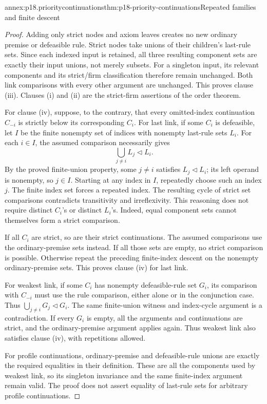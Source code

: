 \begin{annexitem}{annex:p18.prioritycontinuations}{thm:p18-priority-continuations}{Repeated families and finite descent}
\begin{proof}
Adding only strict nodes and axiom leaves creates no new ordinary premise
or defeasible rule. Strict nodes take unions of their children's last-rule
sets. Since each indexed input is retained, all three resulting component
sets are exactly their input unions, not merely subsets.
For a singleton input, its relevant components and its strict/firm
classification therefore remain unchanged. Both link comparisons with
every other argument are unchanged. This proves clause (iii).
Clauses (i) and (ii) are the strict-firm assertions of the order theorem.

For clause (iv), suppose, to the contrary, that every omitted-index
continuation \(C_{-i}\) is strictly below its corresponding \(C_i\).
For last link, if some \(C_i\) is defeasible, let \(I\) be the finite
nonempty set of indices with nonempty last-rule sets \(L_i\).
For each \(i\in I\), the assumed comparison necessarily gives
\[
 \bigcup_{j\ne i}L_j\triangleleft L_i.
 \tag{9}
\]
By the proved finite-union property, some \(j\ne i\) satisfies
\(L_j\triangleleft L_i\); its left operand is nonempty, so \(j\in I\).
Starting at any index in \(I\), repeatedly choose such an index \(j\).
The finite index set forces a repeated index. The resulting cycle of
strict set comparisons contradicts transitivity and irreflexivity.
This reasoning does not require distinct \(C_i\)'s or distinct \(L_i\)'s.
Indeed, equal component sets cannot themselves form a strict comparison.

If all \(C_i\) are strict, so are their strict continuations.
The assumed comparisons use the ordinary-premise sets instead.
If all those sets are empty, no strict comparison is possible.
Otherwise repeat the preceding finite-index descent on the nonempty
ordinary-premise sets. This proves clause (iv) for last link.

For weakest link, if some \(C_i\) has nonempty defeasible-rule set
\(G_i\), its comparison with \(C_{-i}\) must use the rule comparison,
either alone or in the conjunction case. Thus
\(\bigcup_{j\ne i}G_j\triangleleft G_i\).
The same finite-union witness and index-cycle argument is a contradiction.
If every \(G_i\) is empty, all the arguments and continuations are strict,
and the ordinary-premise argument applies again.
Thus weakest link also satisfies clause (iv), with repetitions allowed.

For profile continuations, ordinary-premise and defeasible-rule unions
are exactly the required equalities in their definition.
These are all the components used by weakest link, so its singleton
invariance and the same finite-index argument remain valid.
The proof does not assert equality of last-rule sets for arbitrary
profile continuations.
\end{proof}
\end{annexitem}

